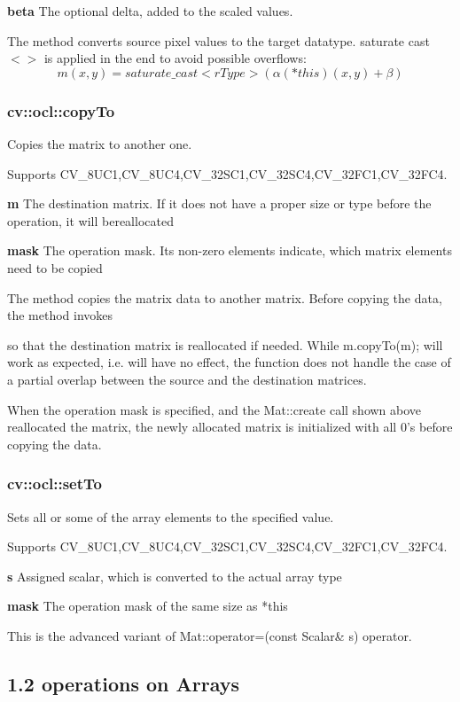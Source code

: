 \documentclass{article}
\begin{document}
\textbf{beta }The optional delta, added to the scaled values.

The method converts source pixel values to the target datatype. saturate
cast$<>$ is applied in the end to avoid possible overflows:
\[
m(x,y)=saturate\_cast<rType>(\alpha (\ast this)(x,y)+\beta )
\]
\newpage

\subsubsection{cv::ocl::copyTo}
\label{subsubsec:mylabel2}
Copies the matrix to another one.

Supports CV{\_}8UC1,CV{\_}8UC4,CV{\_}32SC1,CV{\_}32SC4,CV{\_}32FC1,CV{\_}32FC4.

\textbf{m }The destination matrix. If it does not have a proper size or type
before the operation, it will bereallocated

\textbf{mask }The operation mask. Its non-zero elements indicate, which
matrix elements need to be copied

The method copies the matrix data to another matrix. Before copying the
data, the method invokes

so that the destination matrix is reallocated if needed. While m.copyTo(m);
will work as expected, i.e. will have no effect, the function does not
handle the case of a partial overlap between the source and the destination
matrices.

When the operation mask is specified, and the Mat::create call shown above
reallocated the matrix, the newly allocated matrix is initialized with all
0's before copying the data.

\newpage

\subsubsection{cv::ocl::setTo}
\label{subsubsec:mylabel3}
Sets all or some of the array elements to the specified value.

Supports CV{\_}8UC1,CV{\_}8UC4,CV{\_}32SC1,CV{\_}32SC4,CV{\_}32FC1,CV{\_}32FC4.

\textbf{s }Assigned scalar, which is converted to the actual array type

\textbf{mask }The operation mask of the same size as *this

This is the advanced variant of Mat::operator=(const Scalar{\&} s) operator.

\newpage

\subsection{1.2 operations on Arrays}
\label{subsec:mylabel2}
\end{document}
